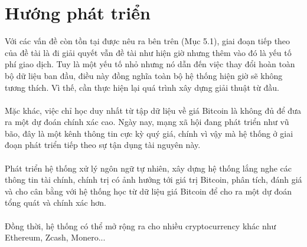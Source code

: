 \section{Hướng phát triển}
Với các vấn đề còn tồn tại được nêu ra bên trên (Mục 5.1), giai đoạn tiếp theo 
của đề tài là đi giải quyết vẫn đề tài như hiện giờ nhưng thêm vào đó là yếu 
tố phí giao dịch. Tuy là một yếu tố nhỏ nhưng nó dẫn đến việc thay đổi hoàn toàn 
bộ dữ liệu ban đầu, điều này đồng nghĩa toàn bộ hệ thống hiện giờ sẽ không 
tương thích. Vì thế, cần thực hiện lại quá trình xây dựng giải thuật từ đầu.\\\\
Mặc khác, việc chỉ học duy nhất từ tập dữ liệu về giá Bitcoin là không đủ để 
đưa ra một dự đoán chính xác cao. Ngày nay, mạng xã hội đang phát triển như vũ 
bão, đây là một kênh thông tin cực kỳ quý giá, chính vì vậy mà hệ thống ở giai 
đoạn phát triển tiếp theo sự tận dụng tài nguyên này.\\\\
Phát triển hệ thống xử lý ngôn ngữ tự nhiên, xây dựng hệ thống lắng nghe các 
thông tin tài chính, chính trị có ảnh hưởng tới giá trị Bitcoin, phân tích, 
đánh giá và cho cân bằng với hệ thống học từ dữ liệu giá Bitcoin để cho ra một 
dự đoán tổng quát và chính xác hơn.\\\\
Đồng thời, hệ thống có thể mở rộng ra cho nhiều cryptocurrency khác như Ethereum,
Zcash, Monero...